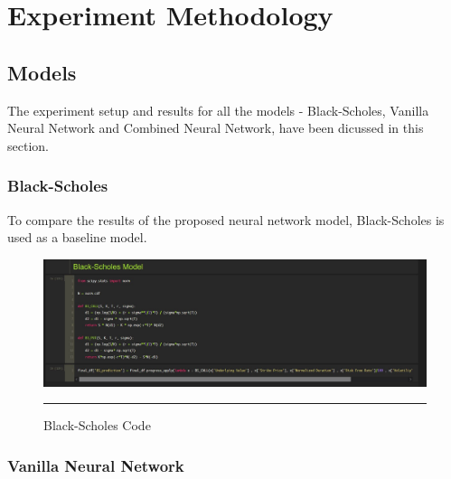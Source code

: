 
\chapter{Experiment Methodology} %

\label{Chapter5} %



\section{Models}

The experiment setup and results for all the models - Black-Scholes, Vanilla Neural Network and Combined Neural Network, have been dicussed in this section.

\subsection{Black-Scholes}

To compare the results of the proposed neural network model, Black-Scholes is used as a baseline model.

\begin{figure}[htbp]
  \centering
    \includegraphics[scale=0.45]{Figures/bs_model.JPG}
    \rule{35em}{0.5pt}
  \caption[Black-Scholes Code]{Black-Scholes Code}
  \label{fig:bs_code}
\end{figure}

\subsection{Vanilla Neural Network}

